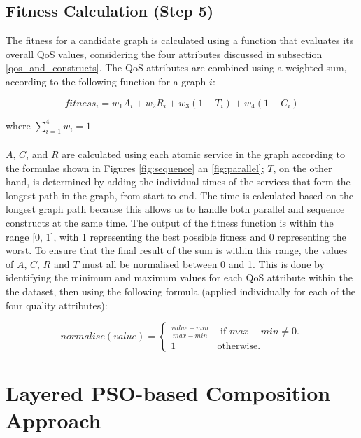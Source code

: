 \documentclass{llncs}
\begin{document}
\subsection{Fitness Calculation (Step 5)}

The fitness for a candidate graph is calculated using a function that evaluates its overall QoS values, considering the four attributes discussed in subsection \ref{qos_and_constructs}. The QoS attributes are combined using a weighted sum, according to the following function for a graph $i$:

\begin{equation}
fitness_i = w_1A_i + w_2R_i + w_3(1 - T_i) + w_4(1 - C_i)
\end{equation}

\noindent where $\sum_{i=1}^{4} w_i = 1$
\\\\
$A$, $C$, and $R$ are calculated using each atomic service in the graph according to the formulae shown in Figures \ref{fig:sequence} an \ref{fig:parallel}; $T$, on the other hand, is determined by adding the individual times of the services that form the longest path in the graph, from start to end. The time is calculated based on the longest graph path because this allows us to handle both parallel and sequence constructs at the same time. The output of the fitness function is within the range [0, 1], with 1 representing the best possible fitness and 0 representing the worst. To ensure that the final result of the sum is within this range, the values of $A$, $C$, $R$ and $T$ must all be normalised between 0 and 1. This is done by identifying the minimum and maximum values for each QoS attribute within the the dataset, then using the following formula (applied individually for each of the four quality attributes):

\begin{equation}
normalise(value) = 
\begin{cases}
	\frac{value - min}{max - min} & \text{ if }max - min \neq 0.\\
	1 & \mathrm{ otherwise}.
\end{cases}
\end{equation}

\section{Layered PSO-based Composition Approach}\label{layered_pso_approach}
\end{document}
